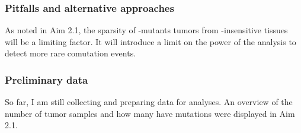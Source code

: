 \subsubsection*{Pitfalls and alternative approaches}

As noted in Aim 2.1, the sparsity of \KRAS{}-mutants tumors from \KRAS{}-insensitive tissues will be a limiting factor.
It will introduce a limit on the power of the analysis to detect more rare comutation events.

\subsubsection*{Preliminary data}

So far, I am still collecting and preparing data for analyses.
An overview of the number of tumor samples and how many have \KRAS{} mutations were displayed in Aim 2.1.



